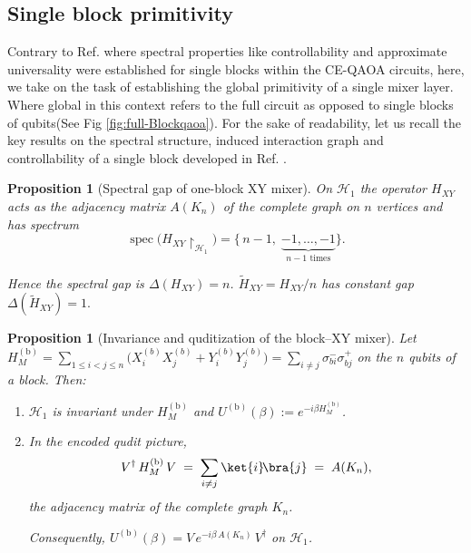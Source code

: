 \documentclass[a4paper,unpublished,onecolumn,11pt]{quantumarticle}
\newtheorem{proposition}[theorem]{Proposition}
\theoremstyle{definition}
\theoremstyle{remark}
\begin{document}
\subsection{Single block primitivity}

Contrary to Ref. \cite{onahce} where spectral properties like controllability and approximate universality were established for single blocks within the CE-QAOA circuits, here, we take on the task of establishing the global primitivity of a single mixer layer. Where global in this context refers to the full circuit as opposed to single blocks of qubits(See Fig \ref{fig:full-Blockqaoa}). For the sake of readability, let us recall the key results on the spectral structure, induced interaction graph and controllability of a single block developed in Ref. \cite{onahce}. 


\begin{proposition}[Spectral gap of one-block XY mixer]
\label{prop:spectral-gap}
On $\mathcal H_{1}$ the operator $H_{XY}$ acts as the adjacency matrix
$A(K_{n})$ of the complete graph on $n$ vertices and has spectrum
\[
   \operatorname{spec}\bigl(H_{XY}\!\upharpoonright_{\mathcal H_{1}}\bigr)
   = \bigl\{\,n-1,\;\underbrace{-1,\dots,-1}_{n-1\text{ times}}\bigr\}.
\]


Hence the spectral gap is $\Delta(H_{XY}) = n$.  
\(
   \widetilde H_{XY}=H_{XY}/n
\)
has constant gap
\(
   \Delta(\widetilde H_{XY}) = 1.
\)
\end{proposition}


\begin{proposition}[Invariance and quditization of the block–XY mixer]
\label{prop:quditization}
Let
\(
H_{M}^{\mathrm{(b)}}=\sum_{1\le i<j\le n}\bigl(X_i^{(b)}X_j^{(b)}+Y_i^{(b)}Y_j^{(b)}\bigr)
=\sum_{i\neq j}\sigma_{bi}^{-}\sigma_{bj}^{+}
\)
on the \(n\) qubits of a block.
Then:
\begin{enumerate}[leftmargin=1.5em]
\item \(\mathcal H_1\) is invariant under \(H_{M}^{\mathrm{(b)}}\) and \(U^{\mathrm{(b)}}(\beta):=e^{-i\beta H_{M}^{\mathrm{(b)}}}\).
\item In the encoded qudit picture,
\[
V^\dagger\,H_{M}^{\mathrm{(b)}}\,V
\;=\;
\sum_{i\neq j}\ket{i}\!\bra{j}
\;=\; A(K_n),
\]
the adjacency matrix of the complete graph \(K_n\).

Consequently,
\(
U^{\mathrm{(b)}}(\beta)
= V\,e^{-i\beta\,A(K_n)}\,V^\dagger
\)
on \(\mathcal H_1\).
\end{enumerate}
\end{proposition}
\end{document}
